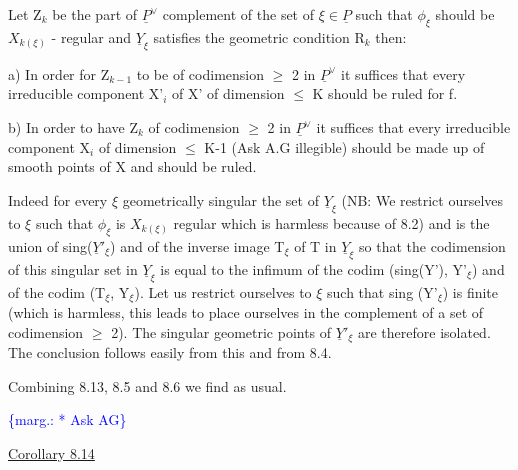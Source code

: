 \documentclass[11pt]{article}
\newcommand{\scanpage}[1]{\par\bigskip\noindent{\small\sffamily[scan #1]}\par}
\newcommand{\mspage}[1]{{\small\sffamily[p.\,#1]}}
\newcommand{\margin}[1]{\textcolor{blue}{\{\textsf{marg.:} #1\}}}
\newcommand{\uline}[1]{\underline{#1}}
\begin{document}
Let Z$_k$ be the part of $\underline{P}^\vee$ complement of the set of $\xi \in \underline{P}$ such that
$\phi_\xi$ should be $X_{k(\xi)}$ - regular and $\underline{Y}_\xi$ satisfies the geometric condition
R$_k$ then:

a) In order for Z$_{k-1}$ to be of codimension $\geq$ 2 in $\underline{P}^\vee$ it
suffices that every irreducible component X'$_i$ of X' of dimension $\leq$
K should be ruled for f.

b) In order to have Z$_k$ of codimension $\geq$ 2 in $\underline{P}^\vee$ it suffices
that every irreducible component X$_i$ of dimension $\leq$ K-1 (Ask A.G
illegible) should be made up of smooth points of X and should be
ruled.

Indeed for every $\xi$ geometrically singular the set of $\underline{Y}_\xi$
(NB:  We restrict ourselves to $\xi$ such that $\phi_\xi$ is $X_{k(\xi)}$ regular which
is harmless because of 8.2) and is the union of sing($\underline{Y}'_\xi$) and of
the inverse image T$_\xi$ of T in $\underline{Y}_\xi$ so that the codimension of this
singular set in $\underline{Y}_\xi$ is equal to the infimum of the codim (sing(Y'),
Y'$_\xi$) and of the codim (T$_\xi$, Y$_\xi$).  Let us restrict ourselves to $\xi$ such
that sing (Y'$_\xi$) is finite (which is harmless, this leads to place
ourselves in the complement of a set of codimension $\geq$ 2).  The
singular geometric points of $\underline{Y}'_\xi$ are therefore isolated.  The
conclusion follows easily from this and from 8.4.

Combining 8.13, 8.5 and 8.6 we find as usual.

\margin{* Ask AG}

\clearpage
\scanpage{24/55}
\mspage{55}

\uline{Corollary 8.14}
\end{document}
